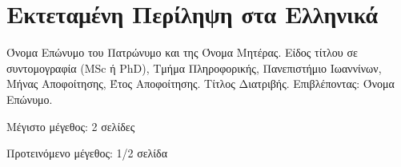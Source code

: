 \chapter*{Εκτεταμένη Περίληψη στα Ελληνικά}

Όνομα Επώνυμο του Πατρώνυμο και της Όνομα Μητέρας. Είδος τίτλου σε
συντομογραφία (MSc ή PhD), Τμήμα Πληροφορικής, Πανεπιστήμιο
Ιωαννίνων, Μήνας Αποφοίτησης, Έτος Αποφοίτησης. Τίτλος Διατριβής.
Επιβλέποντας:  Όνομα Επώνυμο.



\y\noindent Μέγιστο μέγεθος: 2 σελίδες

\y\noindent Προτεινόμενο μέγεθος: 1/2 σελίδα

